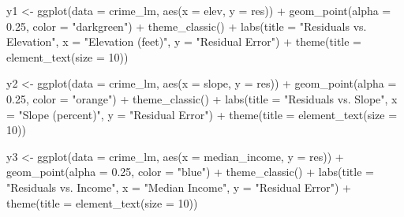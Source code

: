\documentclass[
]{article}
\newenvironment{Shaded}{\begin{snugshade}}{\end{snugshade}}
\newcommand{\AttributeTok}[1]{\textcolor[rgb]{0.77,0.63,0.00}{#1}}
\newcommand{\DecValTok}[1]{\textcolor[rgb]{0.00,0.00,0.81}{#1}}
\newcommand{\FloatTok}[1]{\textcolor[rgb]{0.00,0.00,0.81}{#1}}
\newcommand{\FunctionTok}[1]{\textcolor[rgb]{0.00,0.00,0.00}{#1}}
\newcommand{\NormalTok}[1]{#1}
\newcommand{\OtherTok}[1]{\textcolor[rgb]{0.56,0.35,0.01}{#1}}
\newcommand{\SpecialCharTok}[1]{\textcolor[rgb]{0.00,0.00,0.00}{#1}}
\newcommand{\StringTok}[1]{\textcolor[rgb]{0.31,0.60,0.02}{#1}}
\begin{document}
\begin{Shaded}
\begin{Highlighting}[]
\NormalTok{y1 }\OtherTok{\textless{}{-}} \FunctionTok{ggplot}\NormalTok{(}\AttributeTok{data =}\NormalTok{ crime\_lm, }\FunctionTok{aes}\NormalTok{(}\AttributeTok{x =}\NormalTok{ elev, }\AttributeTok{y =}\NormalTok{ res)) }\SpecialCharTok{+}
  \FunctionTok{geom\_point}\NormalTok{(}\AttributeTok{alpha =} \FloatTok{0.25}\NormalTok{, }\AttributeTok{color =} \StringTok{"darkgreen"}\NormalTok{) }\SpecialCharTok{+} \FunctionTok{theme\_classic}\NormalTok{() }\SpecialCharTok{+} 
  \FunctionTok{labs}\NormalTok{(}\AttributeTok{title =} \StringTok{"Residuals vs. Elevation"}\NormalTok{,}
       \AttributeTok{x =} \StringTok{"Elevation (feet)"}\NormalTok{,}
       \AttributeTok{y =} \StringTok{"Residual Error"}\NormalTok{) }\SpecialCharTok{+}
  \FunctionTok{theme}\NormalTok{(}\AttributeTok{title =} \FunctionTok{element\_text}\NormalTok{(}\AttributeTok{size =} \DecValTok{10}\NormalTok{))}

\NormalTok{y2 }\OtherTok{\textless{}{-}} \FunctionTok{ggplot}\NormalTok{(}\AttributeTok{data =}\NormalTok{ crime\_lm, }\FunctionTok{aes}\NormalTok{(}\AttributeTok{x =}\NormalTok{ slope, }\AttributeTok{y =}\NormalTok{ res)) }\SpecialCharTok{+}
  \FunctionTok{geom\_point}\NormalTok{(}\AttributeTok{alpha =} \FloatTok{0.25}\NormalTok{, }\AttributeTok{color =} \StringTok{"orange"}\NormalTok{) }\SpecialCharTok{+} \FunctionTok{theme\_classic}\NormalTok{() }\SpecialCharTok{+} 
  \FunctionTok{labs}\NormalTok{(}\AttributeTok{title =} \StringTok{"Residuals vs. Slope"}\NormalTok{,}
       \AttributeTok{x =} \StringTok{"Slope (percent)"}\NormalTok{,}
       \AttributeTok{y =} \StringTok{"Residual Error"}\NormalTok{) }\SpecialCharTok{+}
  \FunctionTok{theme}\NormalTok{(}\AttributeTok{title =} \FunctionTok{element\_text}\NormalTok{(}\AttributeTok{size =} \DecValTok{10}\NormalTok{))}

\NormalTok{y3 }\OtherTok{\textless{}{-}} \FunctionTok{ggplot}\NormalTok{(}\AttributeTok{data =}\NormalTok{ crime\_lm, }\FunctionTok{aes}\NormalTok{(}\AttributeTok{x =}\NormalTok{ median\_income, }\AttributeTok{y =}\NormalTok{ res)) }\SpecialCharTok{+}
  \FunctionTok{geom\_point}\NormalTok{(}\AttributeTok{alpha =} \FloatTok{0.25}\NormalTok{, }\AttributeTok{color =} \StringTok{"blue"}\NormalTok{) }\SpecialCharTok{+} \FunctionTok{theme\_classic}\NormalTok{() }\SpecialCharTok{+} 
  \FunctionTok{labs}\NormalTok{(}\AttributeTok{title =} \StringTok{"Residuals vs. Income"}\NormalTok{,}
       \AttributeTok{x =} \StringTok{"Median Income"}\NormalTok{,}
       \AttributeTok{y =} \StringTok{"Residual Error"}\NormalTok{) }\SpecialCharTok{+}
  \FunctionTok{theme}\NormalTok{(}\AttributeTok{title =} \FunctionTok{element\_text}\NormalTok{(}\AttributeTok{size =} \DecValTok{10}\NormalTok{))}


\end{Highlighting}
\end{Shaded}
\end{document}
